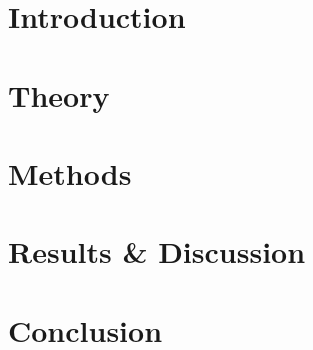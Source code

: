 \documentclass[12pt]{report}
\begin{document}
    \begin{spacing}{1.2}
	\tableofcontents
	\listoffigures
	\end{spacing}
	
	
	\chapter{Introduction}
	
	\chapter{Theory}
	
	\chapter{Methods}
	
	\chapter{Results \& Discussion}
	
	\chapter{Conclusion}
	


\newpage
\cite{Burgess2003} \cite{Cianfrocco2015mechanism} \cite{Dewitt2012} \cite{Capek2017, waczak2019drunken}
\cite{GoodsellArt} \cite{eschbach2011cytoplasmic}
\cite{rao2019molecular} \cite{manna2020mechanistic} \cite{desantis2017lis1} 
\cite{elshenawy2020lis1} \cite{ando2020small} \cite{kinoshita2018step} \cite{qiu2012dynein} \cite{muller1973dynamic} \cite{lim2007vorticity} \cite{fehr2008kinesin} \cite{trott2018mathematical}




\end{document}
